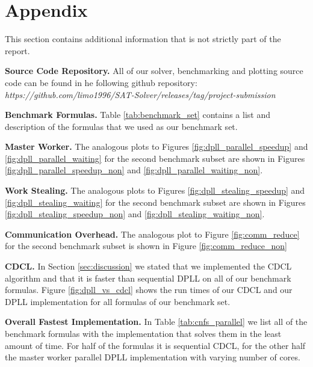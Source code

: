 \documentclass[letterpaper]{article}
\newcommand{\mypar}[1]{{\bf #1.}}
\begin{document}



\newpage
\section{Appendix}
This section contains additional information that is not strictly part of the report.

\mypar{Source Code Repository}
All of our solver, benchmarking and plotting source code can be found in he following github repository:
\textit{https://github.com/limo1996/}\newline\textit{SAT-Solver/releases/tag/project-submission}

\mypar{Benchmark Formulas}
Table \ref{tab:benchmark_set} contains a list and description of the formulas that we used as our benchmark set.

\mypar{Master Worker}
The analogous plots to Figures \ref{fig:dpll_parallel_speedup} and \ref{fig:dpll_parallel_waiting} for the second benchmark subset are shown in Figures \ref{fig:dpll_parallel_speedup_non} and \ref{fig:dpll_parallel_waiting_non}.

\mypar{Work Stealing}
The analogous plots to Figures \ref{fig:dpll_stealing_speedup} and \ref{fig:dpll_stealing_waiting} for the second benchmark subset are shown in Figures \ref{fig:dpll_stealing_speedup_non} and \ref{fig:dpll_stealing_waiting_non}.

\mypar{Communication Overhead}
The analogous plot to Figure \ref{fig:comm_reduce} for the second benchmark subset is shown in Figure \ref{fig:comm_reduce_non}

\mypar{CDCL}
In Section \ref{sec:discussion} we stated that we implemented the CDCL algorithm and that it is faster than sequential DPLL on all of our benchmark formulas.
Figure \ref{fig:dpll_vs_cdcl} shows the run times of our CDCL and our DPLL implementation for all formulas of our benchmark set.

\mypar{Overall Fastest Implementation}
In Table \ref{tab:cnfs_parallel} we list all of the benchmark formulas with the implementation that solves them in the least amount of time.
For half of the formulas it is sequential CDCL, for the other half the master worker parallel DPLL implementation with varying number of cores.
\end{document}
